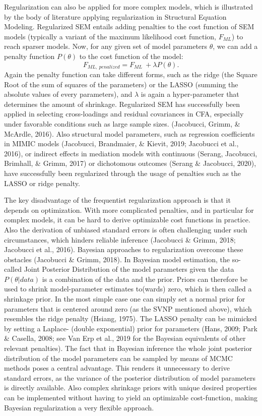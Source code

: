 \documentclass[
  man, donotrepeattitle,floatsintext]{apa6}
\begin{document}
Regularization can also be applied for more complex models, which is illustrated by the body of literature applying regularization in Structural Equation Modeling. Regularized SEM entails adding penalties to the cost function of SEM models (typically a variant of the maximum likelihood cost function, \(F_{ML}\)) to reach sparser models. Now, for any given set of model parameters \(\theta\), we can add a penalty function \(P(\theta)\) to the cost function of the model:
\[F_{ML, \ penalized} = F_{ML} \ + \lambda P(\theta).\]
Again the penalty function can take different forms, such as the ridge (the Square Root of the sum of squares of the parameters) or the LASSO (summing the absolute values of every parameters), and \(\lambda\) is again a hyper-parameter that determines the amount of shrinkage. Regularized SEM has successfully been applied in selecting cross-loadings and residual covariances in CFA, especially under favorable conditions such as large sample sizes. (Jacobucci, Grimm, \& McArdle, 2016). Also structural model parameters, such as regression coefficients in MIMIC models (Jacobucci, Brandmaier, \& Kievit, 2019; Jacobucci et al., 2016), or indirect effects in mediation models with continuous (Serang, Jacobucci, Brimhall, \& Grimm, 2017) or dichotomous outcomes (Serang \& Jacobucci, 2020), have successfully been regularized through the usage of penalties such as the LASSO or ridge penalty.

The key disadvantage of the frequentist regularization approach is that it depends on optimization. With more complicated penalties, and in particular for complex models, it can be hard to derive optimizable cost functions in practice. Also the derivation of unbiased standard errors is often challenging under such circumstances, which hinders reliable inference (Jacobucci \& Grimm, 2018; Jacobucci et al., 2016). Bayesian approaches to regularization overcome these obstacles (Jacobucci \& Grimm, 2018). In Bayesian model estimation, the so-called Joint Posterior Distribution of the model parameters given the data \(P({\theta} | data)\) is a combination of the data and the prior. Priors can therefore be used to shrink model-parameter estimates to(wards) zero, which is then called a shrinkage prior. In the most simple case one can simply set a normal prior for parameters that is centered around zero (as the SVNP mentioned above), which resembles the ridge penalty (Hsiang, 1975). The LASSO penalty can be mimicked by setting a Laplace- (double exponential) prior for parameters (Hans, 2009; Park \& Casella, 2008; see Van Erp et al., 2019 for the Bayesian equivalents of other relevant penalties). The fact that in Bayesian inference the whole joint posterior distribution of the model parameters can be sampled by means of MCMC methods poses a central advantage. This renders it unnecessary to derive standard errors, as the variance of the posterior distribution of model parameters is directly available. Also complex shrinkage priors with unique desired properties can be implemented without having to yield an optimizable cost-function, making Bayesian regularization a very flexible approach.
\end{document}
